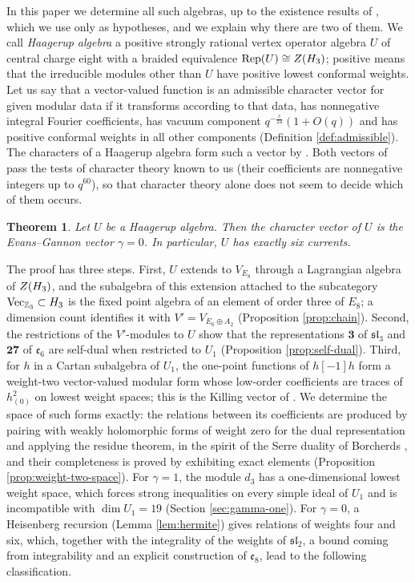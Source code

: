\documentclass[leqno]{article}
\let\cal\relax
\newcommand{\cal}{\mathcal}
\newcommand{\Z}{\ensuremath{\mathbb{Z}}}
\DeclareMathOperator{\Rep}{Rep}
\newtheorem{thm}{Theorem}[section]
\numberwithin{equation}{section}
\begin{document}
In this paper we determine all such algebras, up to the existence results of \cite{Jia26,Rie26}, which we use only as hypotheses, and we explain why there are two of them. We call \emph{Haagerup algebra} a positive strongly rational vertex operator algebra $U$ of central charge eight with a braided equivalence $\Rep(U) \cong Z(\cal H_3)$; positive means that the irreducible modules other than $U$ have positive lowest conformal weights. Let us say that a vector-valued function is an admissible character vector for given modular data if it transforms according to that data, has nonnegative integral Fourier coefficients, has vacuum component $q^{-\frac{c}{24}}(1+O(q))$ and has positive conformal weights in all other components (Definition \ref{def:admissible}). The characters of a Haagerup algebra form such a vector by \cite{Zhu96,Hua08}. Both vectors of \cite{EvG11} pass the tests of character theory known to us (their coefficients are nonnegative integers up to $q^{60}$), so that character theory alone does not seem to decide which of them occurs.

\begin{thm}
\label{thm:intro-gamma}
Let $U$ be a Haagerup algebra. Then the character vector of $U$ is the Evans--Gannon vector $\gamma = 0$. In particular, $U$ has exactly six currents.
\end{thm}

The proof has three steps. First, $U$ extends to $V_{E_8}$ through a Lagrangian algebra of $Z(\cal H_3)$, and the subalgebra of this extension attached to the subcategory $\mathrm{Vec}_{\Z_3} \subset \cal H_3$ is the fixed point algebra of an element of order three of $E_8$; a dimension count identifies it with $V' = V_{E_6 \oplus A_2}$ (Proposition \ref{prop:chain}). Second, the restrictions of the $V'$-modules to $U$ show that the representations $\mathbf 3$ of $\mathfrak{sl}_3$ and $\mathbf{27}$ of $\mathfrak e_6$ are self-dual when restricted to $U_1$ (Proposition \ref{prop:self-dual}). Third, for $h$ in a Cartan subalgebra of $U_1$, the one-point functions of $h[-1]h$ form a weight-two vector-valued modular form whose low-order coefficients are traces of $h_{(0)}^2$ on lowest weight spaces; this is the Killing vector of \cite[Section 2.4]{Gan19}. We determine the space of such forms exactly: the relations between its coefficients are produced by pairing with weakly holomorphic forms of weight zero for the dual representation and applying the residue theorem, in the spirit of the Serre duality of Borcherds \cite[Theorem 3.1]{Bor99}, and their completeness is proved by exhibiting exact elements (Proposition \ref{prop:weight-two-space}). For $\gamma = 1$, the module $d_3$ has a one-dimensional lowest weight space, which forces strong inequalities on every simple ideal of $U_1$ and is incompatible with $\dim U_1 = 19$ (Section \ref{sec:gamma-one}). For $\gamma = 0$, a Heisenberg recursion (Lemma \ref{lem:hermite}) gives relations of weights four and six, which, together with the integrality of the weights of $\mathfrak{sl}_2$, a bound coming from integrability and an explicit construction of $\mathfrak e_8$, lead to the following classification.
\end{document}
